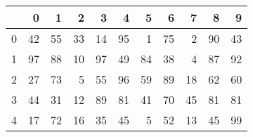 \begin{tabular}{lrrrrrrrrrr}
\toprule
{} &   0 &   1 &   2 &   3 &   4 &   5 &   6 &   7 &   8 &   9 \\
\midrule
0 &  42 &  55 &  33 &  14 &  95 &   1 &  75 &   2 &  90 &  43 \\
1 &  97 &  88 &  10 &  97 &  49 &  84 &  38 &   4 &  87 &  92 \\
2 &  27 &  73 &   5 &  55 &  96 &  59 &  89 &  18 &  62 &  60 \\
3 &  44 &  31 &  12 &  89 &  81 &  41 &  70 &  45 &  81 &  81 \\
4 &  17 &  72 &  16 &  35 &  45 &   5 &  52 &  13 &  45 &  99 \\
\bottomrule
\end{tabular}

